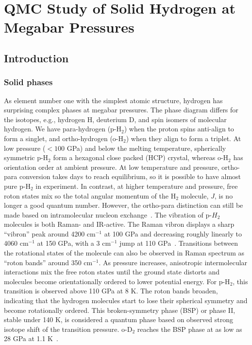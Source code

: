 \chapter{QMC Study of Solid Hydrogen at Megabar Pressures}

\section{Introduction}

\subsection{Solid phases}

As element number one with the simplest atomic structure, hydrogen has surprising complex phases at megabar pressures.
The phase diagram differs for the isotopes, e.g., hydrogen H, deuterium D, and spin isomers of molecular hydrogen.
We have para-hydrogen (p-H$_2$) when the proton spins anti-align to form a singlet, and ortho-hydrogen (o-H$_2$) when they align to form a triplet.
At low pressure ($<100$ GPa) and below the melting temperature, spherically symmetric p-H$_2$ form a hexagonal close packed (HCP) crystal, whereas o-H$_2$ has orientation order at ambient pressure.
At low temperature and pressure, ortho-para conversion takes days to reach equilibrium, so it is possible to have almost pure p-H$_2$ in experiment. In contrast, at higher temperature and pressure, free roton states mix so the total angular momentum of the H$_2$ molecule, $J$, is no longer a good quantum number. However, the ortho-para distinction can still be made based on intramolecular nucleon exchange~\cite{Silvera1998}. 
The vibration of p-$H_2$ molecules is both Raman- and IR-active. The Raman vibron displays a sharp ``vibron'' peak around 4200 cm$^{-1}$ at 100 GPa and decreasing roughly linearly to 4060 cm$^{-1}$ at 150 GPa, with a 3 cm$^{-1}$ jump at 110 GPa~\cite{Lorenzana1990}.
Transitions between the rotational states of the molecule can also be observed in Raman spectrum as ``roton bands'' around 350 cm$^{-1}$. As pressure increases, anisotropic intermolecular interactions mix the free roton states until the ground state distorts and molecules become orientationally ordered to lower potential energy. For p-H$_2$, this transition is observed above 110 GPa at 8 K. The roton bands broaden, indicating that the hydrogen molecules start to lose their spherical symmetry and become rotationally ordered. This broken-symmetry phase (BSP) or phase II, stable under 140 K, is considered a quantum phase based on observed strong isotope shift of the transition pressure. o-D$_2$ reaches the BSP phase at as low as 28 GPa at 1.1 K~\cite{Silvera1981}.
